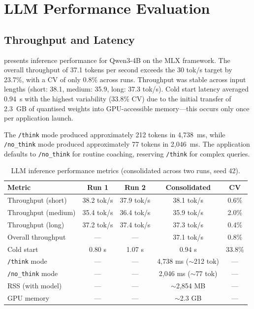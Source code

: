 \section{LLM Performance Evaluation}
\label{sec:llm-evaluation}

\subsection{Throughput and Latency}
\label{subsec:llm-throughput}

 presents inference performance for Qwen3-4B on the MLX framework. The overall throughput of 37.1 tokens per second exceeds the 30 tok/s target by 23.7\%, with a CV of only 0.8\% across runs. Throughput was stable across input lengths (short: 38.1, medium: 35.9, long: 37.3 tok/s). Cold start latency averaged 0.94~s with the highest variability (33.8\% CV) due to the initial transfer of 2.3~GB of quantised weights into GPU-accessible memory---this occurs only once per application launch.

The \texttt{/think} mode produced approximately 212 tokens in 4,738~ms, while \texttt{/no\_think} mode produced approximately 77 tokens in 2,046~ms. The application defaults to \texttt{/no\_think} for routine coaching, reserving \texttt{/think} for complex queries.

\begin{table}[htbp]
  \centering
  \caption{LLM inference performance metrics (consolidated across two runs, seed 42).}
  \label{tab:llm-performance}
  \begin{tabular}{@{}lcccc@{}}
    \toprule
    \textbf{Metric} & \textbf{Run 1} & \textbf{Run 2} & \textbf{Consolidated} & \textbf{CV} \\
    \midrule
    Throughput (short)       & 38.2 tok/s & 37.9 tok/s & 38.1 tok/s  & 0.6\% \\
    Throughput (medium)      & 35.4 tok/s & 36.4 tok/s & 35.9 tok/s  & 2.0\% \\
    Throughput (long)        & 37.2 tok/s & 37.4 tok/s & 37.3 tok/s  & 0.4\% \\
    Overall throughput       & ---        & ---        & 37.1 tok/s  & 0.8\% \\
    Cold start               & 0.80 s     & 1.07 s     & 0.94 s      & 33.8\% \\
    \texttt{/think} mode     & ---        & ---        & 4,738 ms ($\sim$212 tok) & --- \\
    \texttt{/no\_think} mode & ---        & ---        & 2,046 ms ($\sim$77 tok)  & --- \\
    \midrule
    RSS (with model)         & ---        & ---        & $\sim$2,854 MB & --- \\
    GPU memory               & ---        & ---        & $\sim$2.3 GB   & --- \\
    \bottomrule
  \end{tabular}
\end{table}

